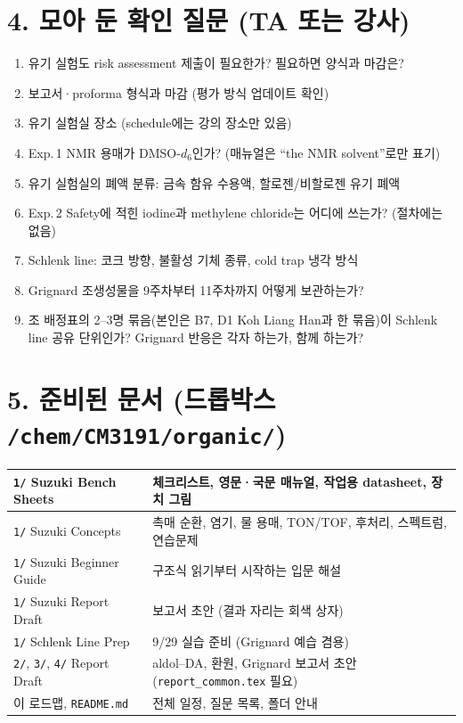 \documentclass[10pt,a4paper]{article}
\begin{document}
\section*{4. 모아 둔 확인 질문 (TA 또는 강사)}
\begin{enumerate}[leftmargin=6mm,itemsep=0.5mm]
\item 유기 실험도 risk assessment 제출이 필요한가? 필요하면 양식과 마감은?
\item 보고서·proforma 형식과 마감 (평가 방식 업데이트 확인)
\item 유기 실험실 장소 (schedule에는 강의 장소만 있음)
\item Exp.\,1 NMR 용매가 DMSO-$d_6$인가? (매뉴얼은 ``the NMR solvent''로만 표기)
\item 유기 실험실의 폐액 분류: 금속 함유 수용액, 할로젠/비할로젠 유기 폐액
\item Exp.\,2 Safety에 적힌 iodine과 methylene chloride는 어디에 쓰는가? (절차에는 없음)
\item Schlenk line: 코크 방향, 불활성 기체 종류, cold trap 냉각 방식
\item Grignard 조생성물을 9주차부터 11주차까지 어떻게 보관하는가?
\item 조 배정표의 2--3명 묶음(본인은 B7, D1 Koh Liang Han과 한 묶음)이 Schlenk line 공유 단위인가? Grignard 반응은 각자 하는가, 함께 하는가?
\end{enumerate}

\section*{5. 준비된 문서 (드롭박스 \texttt{/chem/CM3191/organic/})}
\renewcommand{\arraystretch}{1.2}
\begin{tabularx}{\linewidth}{|l|X|}
\hline
\texttt{1/} Suzuki Bench Sheets & 체크리스트, 영문·국문 매뉴얼, 작업용 datasheet, 장치 그림 \\ \hline
\texttt{1/} Suzuki Concepts & 촉매 순환, 염기, 물 용매, TON/TOF, 후처리, 스펙트럼, 연습문제 \\ \hline
\texttt{1/} Suzuki Beginner Guide & 구조식 읽기부터 시작하는 입문 해설 \\ \hline
\texttt{1/} Suzuki Report Draft & 보고서 초안 (결과 자리는 회색 상자) \\ \hline
\texttt{1/} Schlenk Line Prep & 9/29 실습 준비 (Grignard 예습 겸용) \\ \hline
\texttt{2/}, \texttt{3/}, \texttt{4/} Report Draft & aldol--DA, 환원, Grignard 보고서 초안 (\texttt{report\_common.tex} 필요) \\ \hline
이 로드맵, \texttt{README.md} & 전체 일정, 질문 목록, 폴더 안내 \\ \hline
\end{tabularx}
\renewcommand{\arraystretch}{1}
\end{document}
